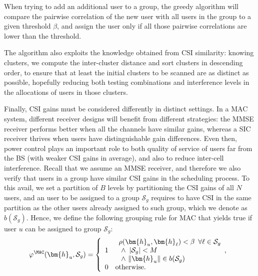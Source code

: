 When trying to add an additional user to a group, the greedy algorithm will compare the pairwise correlation of the new user with all users in the group to a given threshold $\beta$, and assign the user only if all those  pairwise correlations are lower than the threshold.  

The algorithm also exploits the knowledge obtained from CSI similarity: knowing clusters, we compute the inter-cluster distance and sort clusters in descending order, to ensure that at least the initial clusters to be scanned are as distinct as possible, hopefully reducing both testing combinations and interference levels in the allocations of users in those clusters.

Finally, CSI gains must be considered differently in distinct settings. In a MAC system, different receiver designs will benefit from different strategies: the MMSE receiver performs better when all the channels have similar gains, whereas a SIC receiver thrives when users have distinguishable gain differences. Even then, power control plays an important role to both quality of service of users far from the BS (with weaker CSI gains in average), and also to reduce inter-cell interference. 
Recall that we assume an MMSE receiver, and therefore we also verify that users in a group have similar CSI gains in the scheduling process. To this avail, we set a partition of $B$ levels by partitioning the CSI gains of all $N$ users, and an user to be assigned to a group $\mathcal{S}_g$ requires to have CSI in the same partition as the other users already assigned to such group, which we denote as $b(\mathcal{S}_g)$. Hence, we define the following grouping rule for MAC that yields true if user $u$ can be assigned to group $\mathcal{S}_g$:
\begin{align}
	\varphi^{\MAC}(\bm{h}_u,\mathcal{S}_g)=\left\{\begin{array}{ll}1&
		\begin{array}{l}\rho(\bm{h}_u,\bm{h}_{\ell})<\beta\,\,\,\forall \ell\in\mathcal{S}_g\\
			\,\,\wedge\,\,\, |\mathcal{S}_g|<M\\
			\,\,\wedge\,\,\|\bm{h}_u\|\in b(\mathcal{S}_g)\end{array},\\0&\text{otherwise.}\end{array}\right.
	\label{eqn:assignment_rule_mac}
\end{align}

